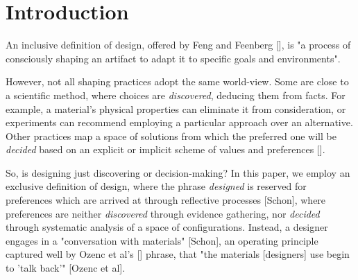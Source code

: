 \documentclass{chi-ext}
\begin{document}

\section{Introduction}

An inclusive definition of design, offered by Feng and Feenberg [], is "a process of consciously shaping an artifact to adapt it to specific goals and environments". 

However, not all shaping practices adopt the same world-view. Some are close to a scientific method, where choices are \emph{discovered}, deducing them from facts. For example,  a material's physical properties can eliminate it from consideration, or experiments can recommend employing a particular approach over an alternative. Other practices map a space of solutions from which the preferred one will be \emph{decided} based on an explicit or implicit scheme of values and preferences []. 

So, is designing just discovering or decision-making? In this paper, we employ an exclusive definition of design, where the phrase \emph{designed} is reserved for preferences which are arrived at through reflective processes [Schon], where preferences are neither \emph{discovered} through evidence gathering, nor \emph{decided} through systematic analysis of a space of configurations. Instead, a designer engages in a "conversation with materials" [Schon], an operating principle captured well by Ozenc et al's [] phrase, that "the materials [designers] use begin to 'talk back'" [Ozenc et al].
\end{document}
